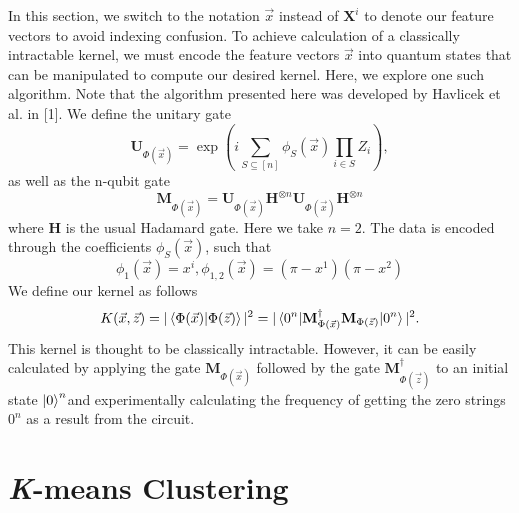 \documentclass[twocolumn, english]{revtex4-2}
\numberwithin{equation}{section}
\begin{document}
In this section, we switch to the notation $\vec{x}$ instead of $\textbf{X}^{i}$ to denote our feature vectors to avoid indexing confusion. To achieve calculation of a classically intractable kernel, we must encode the feature vectors $\vec{x}$ into quantum states that can be manipulated to compute our desired kernel. Here, we explore one such algorithm. Note that the algorithm presented here was developed by Havlicek et al. in [1]. We define the unitary gate \begin{equation}\textbf{U}_{\Phi(\vec{x})}=\exp(i\sum_{S\subseteq[n]}\phi_{S}(\vec{x})\prod_{i\in S}Z_{i}),\end{equation} as well as the n-qubit gate \begin{equation}\textbf{M}_{\Phi(\vec{x})}=\textbf{U}_{\Phi(\vec{x})}\textbf{H}^{\otimes n}\textbf{U}_{\Phi(\vec{x})}\textbf{H}^{\otimes n}\end{equation} where \textbf{H} is the usual Hadamard gate. Here we take $n=2$. The data is encoded through the coefficients $\phi_{S}(\vec{x})$, such that \begin{equation}\phi_{1}(\vec{x})=x^{i}, \phi_{1, 2}(\vec{x})=(\pi-x^{1})(\pi-x^{2})\end{equation} We define our kernel as follows \begin{equation}K(\vec{x}, \vec{z})=|\braket{\Phi(\vec{x})|\Phi(\vec{z})}|^2 = |\braket{0^n|\textbf{M}^{\dag}_{\Phi(\vec{x})}\textbf{M}_{\Phi(\vec{z})}|0^n}|^2. \end{equation} This kernel is thought to be classically intractable. However, it can be easily calculated by applying the gate $\textbf{M}_{\Phi(\vec{x})}$ followed by the gate $\textbf{M}^{\dag}_{\Phi(\vec{z})}$ to an initial state $\ket{0}^{n}$and experimentally calculating the frequency of getting the zero strings $0^n$ as a result from the circuit. 

\section{\textit{K}-means Clustering}
\end{document}
